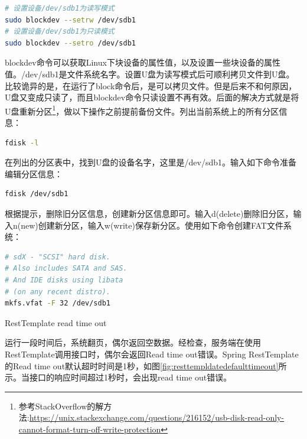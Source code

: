 \documentclass[8pt]{book}
\makeatletter
\numberwithin{dummy}{section}
\theoremstyle{ocrenumbox}
\theoremstyle{blacknumex}
\theoremstyle{blacknumbox}
\theoremstyle{ocrenum}
\renewcommand{\subsection}{\@startsection {subsection}{2}{\z@}
	{-3ex \@plus -0.1ex \@minus -.4ex}
	{0.5ex \@plus.2ex }
	{\normalfont\sffamily\bfseries}}
\makeatother
\begin{document}
\begin{lstlisting}[language=Bash]
# 设置设备/dev/sdb1为读写模式
sudo blockdev --setrw /dev/sdb1
# 设置设备/dev/sdb1为只读模式
sudo blockdev --setro /dev/sdb1
\end{lstlisting}

blockdev命令可以获取Linux下块设备的属性值，以及设置一些块设备的属性值。/dev/sdb1是文件系统名字。设置U盘为读写模式后可顺利拷贝文件到U盘。比较诡异的是，在运行了block命令后，是可以拷贝文件。但是后来不和何原因，U盘又变成只读了，而且blockdev命令只读设置不再有效。后面的解决方式就是将U盘重新分区\footnote{参考StackOverflow的解方法:\url{https://unix.stackexchange.com/questions/216152/usb-disk-read-only-cannot-format-turn-off-write-protection}}，做以下操作之前提前备份文件。列出当前系统上的所有分区信息：

\begin{lstlisting}[language=Bash]
fdisk -l
\end{lstlisting}

在列出的分区表中，找到U盘的设备名字，这里是/dev/sdb1。输入如下命令准备编辑分区信息：

\begin{lstlisting}[language=Bash]
fdisk /dev/sdb1
\end{lstlisting}

根据提示，删除旧分区信息，创建新分区信息即可。输入d(delete)删除旧分区，输入n(new)创建新分区，输入w(write)保存新分区。使用如下命令创建FAT文件系统：

\begin{lstlisting}[language=Bash]
# sdX - "SCSI" hard disk. 
# Also includes SATA and SAS. 
# And IDE disks using libata 
# (on any recent distro).
mkfs.vfat -F 32 /dev/sdb1
\end{lstlisting}

\subsection{RestTemplate read time out}

运行一段时间后，系统翻页，偶尔返回空数据。经检查，服务端在使用RestTemplate调用接口时，偶尔会返回Read time out错误。Spring RestTemplate的Read time out默认超时时间是1秒，如图\ref{fig:resttempldatedefaulttimeout}所示。当接口的响应时间超过1秒时，会出现read time out错误。
\end{document}

